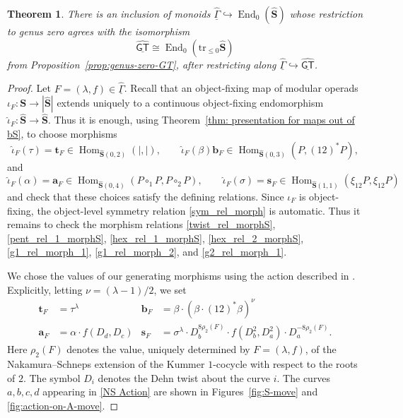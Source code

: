 \documentclass{amsart}
\newcommand{\bS}{\mathbf{S}}
\newcommand{\End}{\operatorname{End}}
\newcommand{\Hom}{\operatorname{Hom}}
\newcommand{\trun}[1]{\mathrm{tr}_{\leq{#1}}}
\newcommand{\GT}{\widehat{\mathsf{GT}}}
\newcommand{\NS}{\widehat{\mathsf{\Gamma}}}
\newtheorem{theorem}{Theorem}[section]
\theoremstyle{definition}
\numberwithin{equation}{section}
\begin{document}
\begin{theorem}\label{main theorem NS action}
There is an inclusion of monoids $\underline{\NS}\hookrightarrow \End_0(\widehat{\bS})$ whose restriction to genus zero agrees with the isomorphism \[\underline{\GT}\cong \End_0(\trun{0}\widehat{\bS})\] from Proposition~\ref{prop:genus-zero-GT}, after restricting along $\underline{\NS}\hookrightarrow\underline{\GT}$.
\end{theorem}

\begin{proof}
Let $F=(\lambda,f)\in\underline{\NS}$. Recall that an object-fixing map of modular operads $\iota_F:\bS\longrightarrow |\widehat{\bS}|$ extends uniquely to a continuous object-fixing endomorphism $\hat{\iota}_F:\widehat{\bS}\longrightarrow \widehat{\bS}.$ Thus it is enough, using Theorem~\ref{thm: presentation for maps out of bS}, to choose morphisms
\[
\hat{\iota}_F(\tau)=\mathbf{t}_F \in \Hom_{\widehat{\bS}(0,2)}(|,|),
\qquad
\hat{\iota}_F(\beta)\mathbf{b}_F \in \Hom_{\widehat{\bS}(0,3)}(P,(12)^*P),
\]
and
\[
\hat{\iota}_F(\alpha)=\mathbf{a}_F \in
\Hom_{\widehat{\bS}(0,4)}(P\circ_1 P,P\circ_2 P),
\qquad
\hat{\iota}_F(\sigma)=\mathbf{s}_F \in
\Hom_{\widehat{\bS}(1,1)}(\xi_{12}P,\xi_{12}P)
\]
and check that these choices satisfy the defining relations. Since $\iota_F$ is object-fixing, the object-level symmetry relation \eqref{sym_rel_morph} is automatic. Thus it remains to check the morphism relations \eqref{twist_rel_morphS}, \eqref{pent_rel_1_morphS}, \eqref{hex_rel_1_morphS}, \eqref{hex_rel_2_morphS}, \eqref{g1_rel_morph_1}, \eqref{g1_rel_morph_2}, and \eqref{g2_rel_morph_1}.

We chose the values of our generating morphisms using the action described in \cite{Nakamura-Schneps}. Explicitly, letting $\nu=(\lambda-1)/2$, we set
\begin{align}
    \mathbf{t}_F& = \tau^\lambda
    &
    \mathbf{b}_F &=\beta \cdot (\beta \cdot (12)^*\beta)^{\nu} \nonumber\\
    \mathbf{a}_F &= \alpha \cdot f(D_{d},D_{c})
    &
    \mathbf{s}_F &= \sigma^{\lambda}\cdot D_{b}^{8\rho_2(F)}\cdot f(D_{b}^2,D_a^2) \cdot D_a^{-8\rho_2(F)} .
    \label{NS Action}
\end{align}
Here $\rho_2(F)$ denotes the value, uniquely determined by $F=(\lambda,f)$, of the Nakamura--Schneps extension of the Kummer $1$-cocycle with respect to the roots of $2$. The symbol $D_i$ denotes the Dehn twist about the curve $i$. The curves $a,b,c,d$ appearing in \eqref{NS Action} are shown in Figures~\ref{fig:S-move} and \ref{fig:action-on-A-move}.
    

\end{proof}
\end{document}
